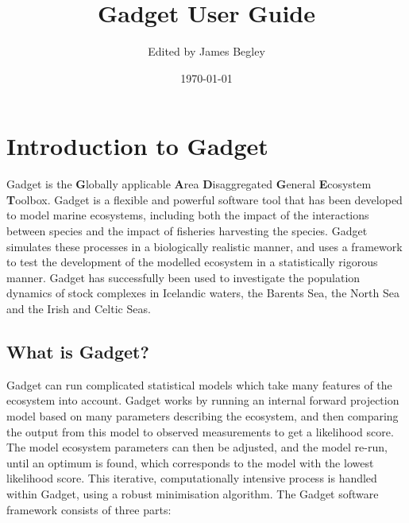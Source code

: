 \documentclass[10pt,twoside]{book}
\begin{document}
\title{\Huge{Gadget User Guide}}
\author{Edited by James Begley}
\date{\today}  %
\maketitle

\setlength{\parindent}{0mm}


\pagestyle{fancy}
\fancyhf{}
\renewcommand{\chaptermark}[1]{\markboth{\textbf{\thechapter}\ \emph{#1}}{}}
\fancyhead[LO,RE]{}
\fancyhead[LE,RO]{\nouppercase{\leftmark}}
\fancyfoot[LE,RO]{\textbf{\thepage}}
\fancyfoot[LO,RE]{}


\thispagestyle{empty}

\frontmatter
{}
\tableofcontents

\mainmatter
{}

\chapter{Introduction to Gadget}\label{chap:intro}
Gadget is the {\bf G}lobally applicable {\bf A}rea {\bf D}isaggregated {\bf G}eneral {\bf E}cosystem {\bf T}oolbox.  Gadget is a flexible and powerful software tool that has been developed to model marine ecosystems, including both the impact of the interactions between species and the impact of fisheries harvesting the species.  Gadget simulates these processes in a biologically realistic manner, and uses a framework to test the development of the modelled ecosystem in a statistically rigorous manner.  Gadget has successfully been used to investigate the population dynamics of stock complexes in Icelandic waters, the Barents Sea, the North Sea and the Irish and Celtic Seas.

\section{What is Gadget?}\label{sec:whatisgadget}
Gadget can run complicated statistical models which take many features of the ecosystem into account. Gadget works by running an internal forward projection model based on many parameters describing the ecosystem, and then comparing the output from this model to observed measurements to get a likelihood score.  The model ecosystem parameters can then be adjusted, and the model re-run, until an optimum is found, which corresponds to the model with the lowest likelihood score.  This iterative, computationally intensive process is handled within Gadget, using a robust minimisation algorithm.  The Gadget software framework consists of three parts:
\end{document}
